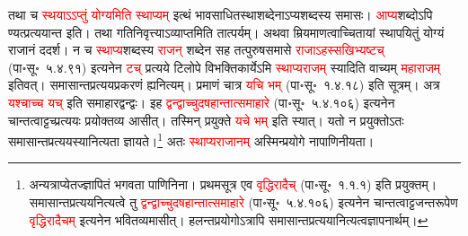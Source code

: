 \begin{sloppypar}
तथा च \textcolor{red}{स्थयाऽऽप्तुं योग्यमिति स्थाप्यम्} इत्थं भाव\-साधित\-स्था\-शब्देनाऽप्य\-शब्दस्य समासः। \textcolor{red}{आप्य}\-शब्दोऽपि ण्यत्प्रत्ययान्त इति। तथा गति\-निवृत्त्याऽव्याप्तमिति तात्पर्यम्। अथवा म्रियमाणत्वाच्चितायां स्थापयितुं योग्यं राजानं ददर्श। न च \textcolor{red}{स्थाप्य}\-शब्दस्य \textcolor{red}{राजन्} शब्देन सह तत्पुरुष\-समासे \textcolor{red}{राजाऽहस्सखिभ्यष्टच्} (पा॰सू॰~५.४.९१) इत्यनेन \textcolor{red}{टच्} प्रत्यये टिलोपे विभक्ति\-कार्येऽमि \textcolor{red}{स्थाप्य\-राजम्} स्यादिति वाच्यम् \textcolor{red}{महाराजम्} इतिवत्। समासान्त\-प्रत्यय\-प्रकरणं ह्यनित्यम्। प्रमाणं चात्र \textcolor{red}{यचि भम्} (पा॰सू॰~१.४.१८) इति सूत्रम्। अत्र \textcolor{red}{यश्चाच्च यच्} इति समाहार\-द्वन्द्वः। इह \textcolor{red}{द्वन्द्वाच्चु\-दषहान्तात्समाहारे} (पा॰सू॰~५.४.१०६) इत्यनेन चान्तत्वाट्टच्प्रत्ययः प्रयोक्तव्य आसीत्। तस्मिन् प्रयुक्ते \textcolor{red}{यचे भम्} इति स्यात्। यतो न प्रयुक्तोऽतः समासान्त\-प्रत्ययस्यानित्यता ज्ञायते।\footnote{अन्यत्राप्येतज्ज्ञापितं भगवता पाणिनिना। प्रथमसूत्र एव \textcolor{red}{वृद्धिरादैच्} (पा॰सू॰~१.१.१) इति प्रयुक्तम्। समासान्त\-प्रत्यय\-नित्यत्वे तु \textcolor{red}{द्वन्द्वाच्चु\-दषहान्तात्समाहारे} (पा॰सू॰~५.४.१०६) इत्यनेन चान्तत्वाट्टजन्तरूपेण \textcolor{red}{वृद्धिरादैचम्} इत्यनेन भवितव्यमासीत्। हलन्तप्रयोगोऽत्रापि समासान्त\-प्रत्ययानित्यत्व\-ज्ञापनार्थम्।} अतः \textcolor{red}{स्थाप्य\-राजानम्} अस्मिन्प्रयोगे नापाणिनीयता।\end{sloppypar}
